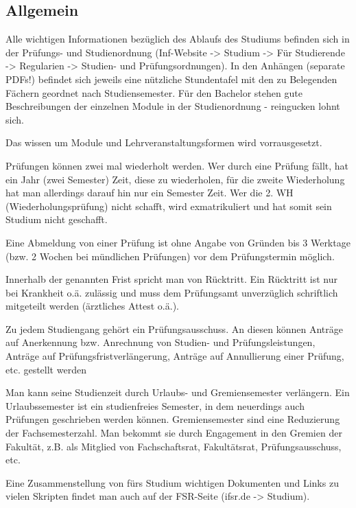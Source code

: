\documentclass[a4paper,12pt]{report}
\begin{document}
\subsection{Allgemein}
\begin{itemize*}
	\item Alle wichtigen Informationen bezüglich des Ablaufs des Studiums befinden sich in der Prüfungs- und Studienordnung (Inf-Website -> Studium -> Für Studierende -> Regularien -> Studien- und Prüfungsordnungen).
	In den Anhängen (separate PDFs!) befindet sich jeweils eine nützliche Stundentafel mit den zu Belegenden Fächern geordnet nach Studiensemester.
	Für den Bachelor stehen gute Beschreibungen der einzelnen Module in der Studienordnung - reingucken lohnt sich.

	\item Das wissen um Module und Lehrveranstaltungsformen wird vorrausgesetzt.
	\item Prüfungen können zwei mal wiederholt werden.
	Wer durch eine Prüfung fällt, hat ein Jahr (zwei Semester) Zeit, diese zu wiederholen, für die zweite Wiederholung hat man allerdings darauf hin nur ein Semester Zeit.
	Wer die 2. WH (Wiederholungsprüfung) nicht schafft, wird exmatrikuliert und hat somit sein Studium nicht geschafft.
	\item Eine Abmeldung von einer Prüfung ist ohne Angabe von Gründen bis 3 Werktage (bzw. 2 Wochen bei mündlichen Prüfungen) vor dem Prüfungstermin möglich.
	\item Innerhalb der genannten Frist spricht man von Rücktritt.
	Ein Rücktritt ist nur bei Krankheit o.ä. zulässig und muss dem Prüfungsamt unverzüglich schriftlich mitgeteilt werden (ärztliches Attest o.ä.).
	
	\item Zu jedem Studiengang gehört ein Prüfungsausschuss.
	An diesen können Anträge auf Anerkennung bzw. Anrechnung von Studien- und Prüfungsleistungen, Anträge auf Prüfungsfristverlängerung, Anträge auf Annullierung einer Prüfung, etc. gestellt werden
	\item Man kann seine Studienzeit durch Urlaubs- und Gremiensemester verlängern.
	Ein Urlaubssemester ist ein studienfreies Semester, in dem neuerdings auch Prüfungen geschrieben werden können. 	Gremiensemester sind eine Reduzierung der Fachsemesterzahl.
	Man bekommt sie durch Engagement in den Gremien der Fakultät, z.B. als Mitglied von Fachschaftsrat, Fakultätsrat, Prüfungsausschuss, etc.
	\item Eine Zusammenstellung von fürs Studium wichtigen Dokumenten und Links zu vielen Skripten findet man auch auf der FSR-Seite (ifsr.de -> Studium).

\end{itemize*}
\end{document}
